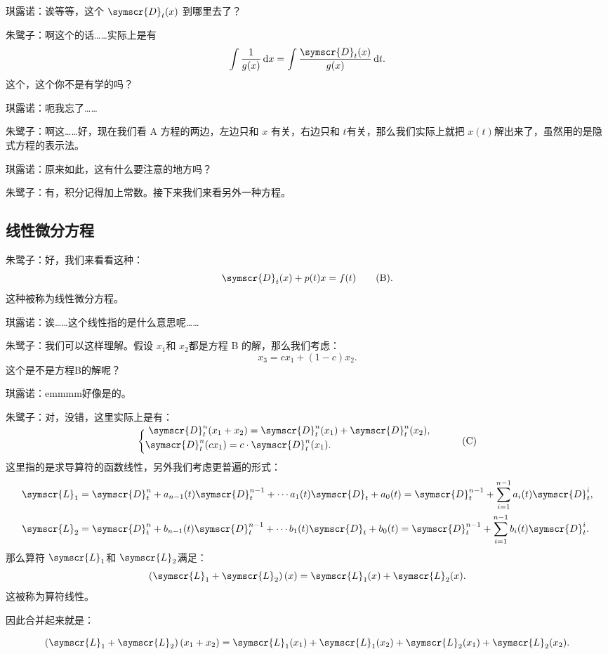 \documentclass{ctexart}
\newcommand{\dx}{\symscr{D} _t (x)}
\begin{document}
琪露诺：诶等等，这个 \(\symscr{D} _t(x)\) 到哪里去了？

朱鹭子：啊这个的话……实际上是有
\[
    \int \frac{1}{g(x)} \,\mathrm{d}x =\int \frac{\symscr{D} _t(x)}{g(x)} \,\mathrm{d}t
    .\]
这个，这个你不是有学的吗？

琪露诺：呃我忘了……

朱鹭子：啊这……好，现在我们看 A 方程的两边，左边只和 \(x\) 有关，右边只和 \(t\)有关，那么我们实际上就把 \(x(t)\)解出来了，虽然用的是隐式方程的表示法。

琪露诺：原来如此，这有什么要注意的地方吗？

朱鹭子：有，积分记得加上常数。接下来我们来看另外一种方程。
\subsection{线性微分方程}
朱鹭子：好，我们来看看这种：
\[
    \dx{}+p(t)x=f(t)\tag{B}
    .\]
这种被称为线性微分方程。

琪露诺：诶……这个线性指的是什么意思呢……

朱鹭子：我们可以这样理解。假设 \(x_1\)和 \(x_2\)都是方程  B 的解，那么我们考虑：
\[
    x_3=cx_1+(1-c)x_2
    .\]
这个是不是方程B的解呢？

琪露诺：emmmm好像是的。

朱鹭子：对，没错，这里实际上是有：
\[
    \begin{cases}
        \\[-2.2em]\
        \symscr{D} _t^n(x_1+x_2)=\symscr{D} _t^n(x_1)+\symscr{D} _t^n(x_2), \\
        \symscr{D} _t^n(cx_1)=c\cdot \symscr{D} _t^n(x_1).
    \end{cases}\tag{C}
\]
这里指的是求导算符的函数线性，另外我们考虑更普遍的形式：
\[
    \begin{aligned}
         & \symscr{L}_1 =\symscr{D} _t^n +a_{n-1}(t)\symscr{D} _t^{n-1}+\cdots a_1(t)\symscr{D} _t +a_0(t)=\symscr{D} _t^{n-1}+\sum\limits_{i=1}^{n-1} a_{i}(t)\symscr{D} _t^i , \\
         & \symscr{L}_2 =\symscr{D} _t^n +b_{n-1}(t)\symscr{D} _t^{n-1}+\cdots b_1(t)\symscr{D} _t +b_0(t)=\symscr{D} _t^{n-1}+\sum\limits_{i=1}^{n-1} b_{i}(t)\symscr{D} _t^i.
    \end{aligned}
\]
那么算符 \(\symscr{L}_1 \)和 \(\symscr{L} _2\)满足：
\[
    \left(\symscr{L} _1+\symscr{L} _2 \right) (x)=\symscr{L} _1(x)+\symscr{L} _2 (x)
    .\]
这被称为算符线性。

因此合并起来就是：

\[
    \left( \symscr{L} _1+\symscr{L} _2 \right) \left( x_1+x_2 \right) =\symscr{L} _1(x_1)+\symscr{L} _1(x_2)+\symscr{L} _2(x_1)+\symscr{L} _2(x_2)
    .\]
\end{document}

